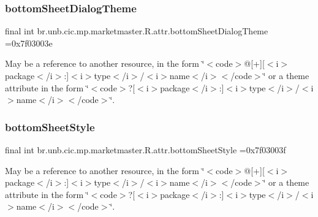 \subsubsection{\texorpdfstring{bottom\+Sheet\+Dialog\+Theme}{bottomSheetDialogTheme}}
{\footnotesize\ttfamily final int br.\+unb.\+cic.\+mp.\+marketmaster.\+R.\+attr.\+bottom\+Sheet\+Dialog\+Theme =0x7f03003e\hspace{0.3cm}{\ttfamily [static]}}

May be a reference to another resource, in the form \char`\"{}$<$code$>$@\mbox{[}+\mbox{]}\mbox{[}$<$i$>$package$<$/i$>$\+:\mbox{]}$<$i$>$type$<$/i$>$/$<$i$>$name$<$/i$>$$<$/code$>$\char`\"{} or a theme attribute in the form \char`\"{}$<$code$>$?\mbox{[}$<$i$>$package$<$/i$>$\+:\mbox{]}$<$i$>$type$<$/i$>$/$<$i$>$name$<$/i$>$$<$/code$>$\char`\"{}. \mbox{\label{classbr_1_1unb_1_1cic_1_1mp_1_1marketmaster_1_1R_1_1attr_ad6ae3dee0caa094fc198ae2e503c1bf3}} 
\subsubsection{\texorpdfstring{bottom\+Sheet\+Style}{bottomSheetStyle}}
{\footnotesize\ttfamily final int br.\+unb.\+cic.\+mp.\+marketmaster.\+R.\+attr.\+bottom\+Sheet\+Style =0x7f03003f\hspace{0.3cm}{\ttfamily [static]}}

May be a reference to another resource, in the form \char`\"{}$<$code$>$@\mbox{[}+\mbox{]}\mbox{[}$<$i$>$package$<$/i$>$\+:\mbox{]}$<$i$>$type$<$/i$>$/$<$i$>$name$<$/i$>$$<$/code$>$\char`\"{} or a theme attribute in the form \char`\"{}$<$code$>$?\mbox{[}$<$i$>$package$<$/i$>$\+:\mbox{]}$<$i$>$type$<$/i$>$/$<$i$>$name$<$/i$>$$<$/code$>$\char`\"{}. \mbox{\label{classbr_1_1unb_1_1cic_1_1mp_1_1marketmaster_1_1R_1_1attr_ab623b9b10b785557c21779b6772e4274}} 
